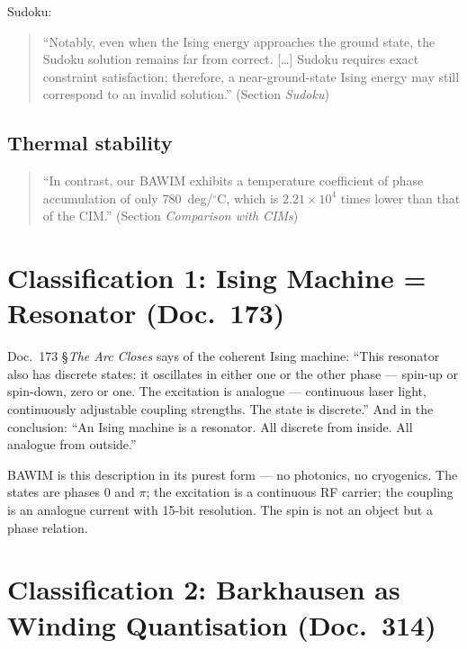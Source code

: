 Sudoku:
\begin{quote}\QM
``Notably, even when the Ising energy approaches the ground state, the
Sudoku solution remains far from correct. [\ldots] Sudoku requires exact
constraint satisfaction; therefore, a near-ground-state Ising energy may
still correspond to an invalid solution.'' (Section \emph{Sudoku})
\end{quote}

\subsection{Thermal stability}

\begin{quote}\QM
``In contrast, our BAWIM exhibits a temperature coefficient of phase
accumulation of only 780~deg/$^\circ$C, which is $2.21\times10^4$ times
lower than that of the CIM.'' (Section \emph{Comparison with CIMs})
\end{quote}

\section{Classification 1: Ising Machine = Resonator (Doc.~173)}

Doc.~173 §\emph{The Arc Closes} says of the coherent Ising machine: ``This
resonator also has discrete states: it oscillates in either one or the
other phase --- spin-up or spin-down, zero or one. The excitation is
analogue --- continuous laser light, continuously adjustable coupling
strengths. The state is discrete.'' And in the conclusion: ``An Ising
machine is a resonator. All discrete from inside. All analogue from
outside.''

BAWIM is this description in its purest form --- no photonics, no
cryogenics. The states are phases 0 and $\pi$; the excitation is a
continuous RF carrier; the coupling is an analogue current with 15-bit
resolution. The spin is not an object but a phase relation. \SM

\section{Classification 2: Barkhausen as Winding Quantisation (Doc.~314)}


